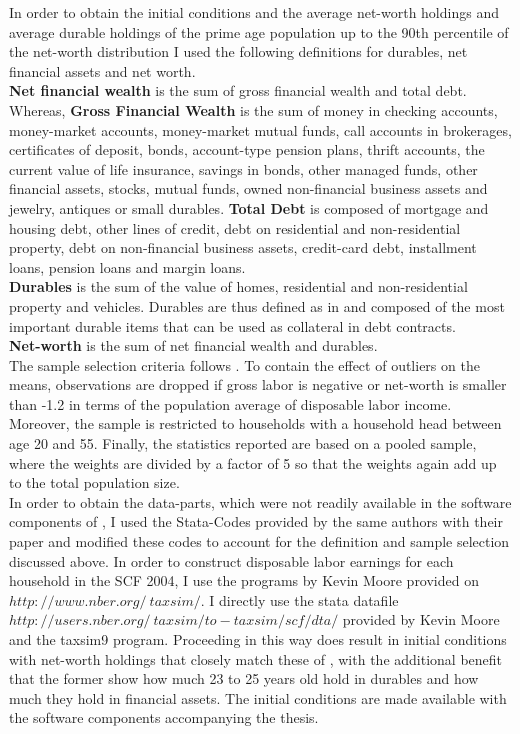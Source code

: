 \documentclass[12pt,a4paper,leqno]{article}
\theoremstyle{definition}
\begin{document}
In order to obtain the initial conditions and the average net-worth holdings and average durable holdings of the prime age population up to the 90th percentile of the net-worth distribution I used the following definitions for durables, net financial assets and net worth. \\
\textbf{Net financial wealth} is the sum of gross financial wealth and total debt. Whereas, \textbf{Gross Financial Wealth} is the sum of money in checking accounts, money-market accounts, money-market mutual funds, call accounts in brokerages, certificates of deposit, bonds, account-type pension plans, thrift accounts, the current value of life insurance, savings in bonds, other managed funds, other financial assets, stocks, mutual funds, owned non-financial business assets and jewelry, antiques or small durables.
\textbf{Total Debt} is composed of mortgage and housing debt, other lines of credit, debt on residential and non-residential property, debt on non-financial business assets, credit-card debt, installment loans, pension loans and margin loans.\\
\textbf{Durables} is the sum of the value of homes, residential and non-residential property and vehicles. Durables are thus defined as in \cite{hintermaier2010} and composed of the most important durable items that can be used as collateral in debt contracts. \\  \textbf{Net-worth} is the sum of net financial wealth and durables.  \\
The sample selection criteria follows \cite{hintermaier2011}. To contain the effect of outliers on the means, observations are dropped if gross labor is negative or net-worth is smaller than -1.2 in terms of the population average of disposable labor income. Moreover, the sample is restricted to households with a household head between age 20 and 55. 
Finally, the statistics reported are based on a pooled sample, where the weights are divided by a factor of 5 so that the weights again add up to the total population size. \\
In order to obtain the data-parts, which were not readily available in the software components of \cite{hintermaier2011}, I used the Stata-Codes provided by the same authors with their paper \cite{hintermaier2016} and modified these codes to account for the definition and sample selection discussed above. In order to construct disposable labor earnings for each household in the SCF 2004, I use the programs by Kevin Moore provided on $http://www.nber.org/~taxsim/$.  I directly use the stata datafile $http://users.nber.org/~taxsim/to-taxsim/scf/dta/$ provided by Kevin Moore and the taxsim9 program. Proceeding in this way does result in initial conditions with net-worth holdings that closely match these of \cite{hintermaier2011}, with the additional benefit that the former show how much 23 to 25 years old hold in durables and how much they hold in financial assets. The initial conditions are made available with the software components accompanying the thesis.
\end{document}
